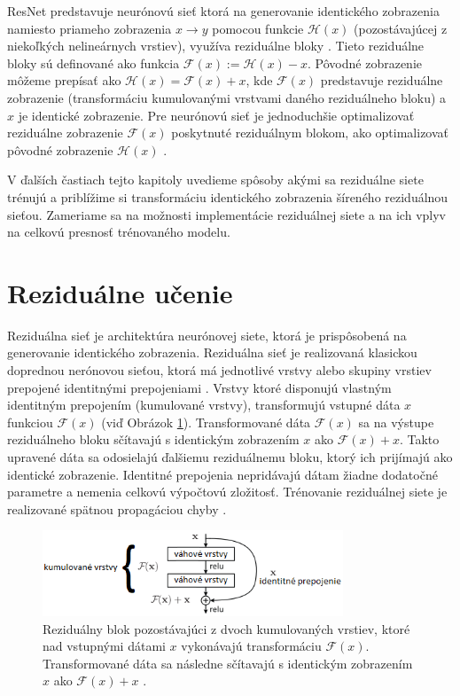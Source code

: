 ResNet predstavuje neurónovú sieť ktorá na generovanie identického zobrazenia namiesto priameho zobrazenia $x\rightarrow y$ pomocou funkcie $\mathcal{H}(x)$ (pozostávajúcej z niekoľkých nelineárnych vrstiev), využíva reziduálne bloky \cite{Wu2017}. Tieto reziduálne bloky sú definované ako funkcia $\mathcal{F}(x) := \mathcal{H}(x) - x$. Pôvodné zobrazenie môžeme prepísať ako $\mathcal{H}(x) = \mathcal{F}(x) + x$, kde $\mathcal{F}(x)$ predstavuje reziduálne zobrazenie (transformáciu kumulovanými vrstvami daného reziduálneho bloku) a $x$ je identické zobrazenie. Pre neurónovú sieť je jednoduchšie optimalizovať reziduálne zobrazenie $\mathcal{F}(x)$ poskytnuté reziduálnym blokom, ako optimalizovať pôvodné zobrazenie $\mathcal{H}(x)$ \cite{Wu2017}.

V ďalších častiach tejto kapitoly uvedieme spôsoby akými sa reziduálne siete trénujú a priblížime si transformáciu identického zobrazenia šíreného reziduálnou sieťou. Zameriame sa na možnosti implementácie reziduálnej siete a na ich vplyv na celkovú presnosť trénovaného modelu.

\section{Reziduálne učenie}
\label{residual_learning}

Reziduálna sieť je architektúra neurónovej siete, ktorá je prispôsobená na generovanie identického zobrazenia. Reziduálna sieť je realizovaná klasickou doprednou nerónovou sieťou, ktorá má jednotlivé vrstvy alebo skupiny vrstiev prepojené identitnými prepojeniami \cite{Wu2017}. Vrstvy ktoré disponujú vlastným identitným prepojením (kumulované vrstvy), transformujú vstupné dáta $x$ funkciou $\mathcal{F}(x)$ (viď Obrázok \ref{fig:residualBlock}). Transformované dáta $\mathcal{F}(x)$ sa na výstupe reziduálneho bloku sčítavajú s identickým zobrazením $x$ ako $\mathcal{F}(x)+x$. Takto upravené dáta sa odosielajú ďalšiemu reziduálnemu bloku, ktorý ich prijímajú ako identické zobrazenie. Identitné prepojenia nepridávajú dátam žiadne dodatočné parametre a nemenia celkovú výpočtovú zložitosť. Trénovanie reziduálnej siete je realizované spätnou propagáciou chyby \cite{Wu2017}.

\begin{figure}

\centerline{\includegraphics[width=0.8\textwidth]{images/residualBlock}}
\caption[Reziduálny blok]{Reziduálny blok pozostávajúci z dvoch kumulovaných vrstiev, ktoré nad vstupnými dátami $x$ vykonávajú transformáciu $\mathcal{F}(x)$. Transformované dáta sa následne sčítavajú s identickým zobrazením $x$ ako $\mathcal{F}(x) + x$ \cite{Wu2017}.}
\label{fig:residualBlock}
\end{figure}


